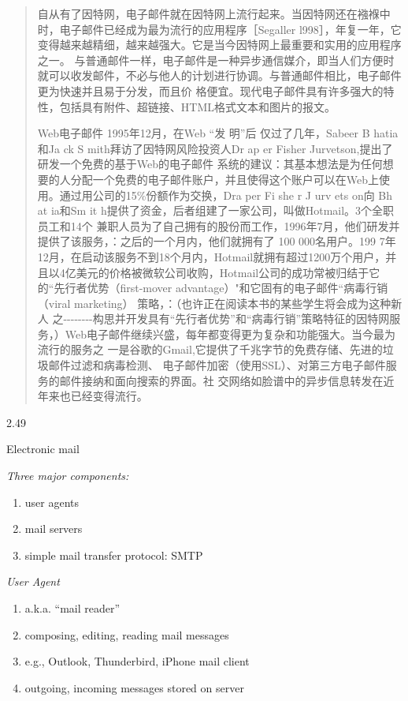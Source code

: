 \documentclass[
]{article}
\begin{document}
\begin{quote}
自从有了因特网，电子邮件就在因特网上流行起来。当因特网还在襁褓中时，电子邮件已经成为最为流行的应用程序［Segaller
l998］，年复一年，它变得越来越精细，越来越强大。它是当今因特网上最重要和实用的应用程序之一。
与普通邮件一样，电子邮件是一种异步通信媒介，即当人们方便时就可以收发邮件，不必与他人的计划进行协调。与普通邮件相比，电子邮件更为快速并且易于分发，而且价
格便宜。现代电子邮件具有许多强大的特性，包括具有附件、超链接、HTML格式文本和图片的报文。

Web电子邮件 1995年12月，在Web ``发 明''后 仅过了几年，Sabeer B hatia和Ja
ck S mith拜访了因特网风险投资人Dr ap er Fisher
Jurvetson,提出了研发一个免费的基于Web的电子邮件
系统的建议：其基本想法是为任何想要的人分配一个免费的电子邮件账户，并且使得这个账户可以在Web上使用。通过用公司的15\%份额作为交换，Dra
per Fi she r J urv ets on向 Bh at ia和Sm it
h提供了资金，后者组建了一家公司，叫做Hotmail。3个全职员工和14个
兼职人员为了自己拥有的股份而工作，1996年7月，他们研发并提供了该服务，：之后的一个月内，他们就拥有了
100 000名用户。199
7年12月，在启动该服务不到18个月内，Hotmail就拥有超过1200万个用户，并且以4亿美元的价格被微软公司收购，Hotmail公司的成功常被归结于它的``先行者优势（first-mover
advantage）"和它固有的电子邮件``病毒行销（viral marketing）
策略，：（也许正在阅读本书的某些学生将会成为这种新人
之-\/-\/-\/-\/-\/-\/-\/-构思并开发具有``先行者优势''和``病毒行销''策略特征的因特网服务，）Web电子邮件继续兴盛，每年都变得更为复杂和功能强大。当今最为流行的服务之
一是谷歌的Gmail,它提供了千兆字节的免费存储、先进的垃圾邮件过滤和病毒检测、
电子邮件加密（使用SSL）、对第三方电子邮件服务的邮件接纳和面向搜索的界面。社
交网络如脸谱中的异步信息转发在近年来也已经变得流行。
\end{quote}

2.49

Electronic mail

\emph{Three major components:}

\begin{enumerate}
\def\labelenumi{\arabic{enumi}.}
\item
  user agents
\item
  mail servers
\item
  simple mail transfer protocol: SMTP
\end{enumerate}

\emph{User Agent}

\begin{enumerate}
\def\labelenumi{\arabic{enumi}.}
\item
  a.k.a. ``mail reader''
\item
  composing, editing, reading mail messages
\item
  e.g., Outlook, Thunderbird, iPhone mail client
\item
  outgoing, incoming messages stored on server
\end{enumerate}
\end{document}
